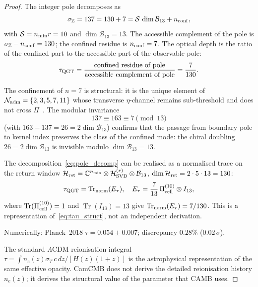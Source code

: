 \documentclass[twocolumn,10pt]{article}
\newcommand{\Nadm}{\mathcal{N}_{\rm adm}}
\newcommand{\Bone}{\mathcal{B}_{13}}
\begin{document}
\begin{proof}
The integer pole decomposes as
\begin{equation}
  \sigma_{\mathbb{Z}} = 137 = 130 + 7
  = \mathcal{S}\,\dim\Bone + n_{\rm conf},
  \label{eq:pole_decomp}
\end{equation}
with $\mathcal{S}=n_{\rm min}r=10$ and $\dim\Bone=13$.
The accessible complement of the pole is $\sigma_{\mathbb{Z}}-n_{\rm conf}=130$;
the confined residue is $n_{\rm conf}=7$.
The optical depth is the ratio of the confined part to the accessible
part of the observable pole:
\begin{equation*}
  \tau_{\rm QGT}
  = \frac{\text{confined residue of pole}}{\text{accessible complement of pole}}
  = \frac{7}{130}.
\end{equation*}

The confinement of $n=7$ is structural: it is the unique element of
$\Nadm=\{2,3,5,7,11\}$ whose transverse $\eta$-channel remains
sub-threshold and does not cross $\Pi$~\cite{CamP11,CamKer163}.
The modular invariance
\begin{equation*}
  137 \equiv 163 \equiv 7 \pmod{13}
\end{equation*}
(with $163-137=26=2\dim\Bone$) confirms that the passage from boundary
pole to kernel index preserves the class of the confined mode:
the chiral doubling $26=2\dim\Bone$ is invisible modulo $\dim\Bone=13$.

The decomposition~\eqref{eq:pole_decomp} can be realised as a
normalised trace on the return window
$\mathcal{H}_{\rm ret}=\mathbb{C}^{n_{\rm min}}\otimes
\mathcal{H}_{\rm SVD}^{(r)}\otimes\Bone$,
$\dim\mathcal{H}_{\rm ret}=2\cdot5\cdot13=130$:
\begin{equation*}
  \tau_{\rm QGT}
  = \operatorname{Tr}_{\rm norm}(E_\tau),
  \quad
  E_\tau = \frac{7}{13}\,\Pi_{\rm cell}^{(10)}\otimes I_{13},
\end{equation*}
where $\operatorname{Tr}(\Pi_{\rm cell}^{(10)})=1$ and
$\operatorname{Tr}(I_{13})=13$ give
$\operatorname{Tr}_{\rm norm}(E_\tau)=7/130$.
This is a representation of~\eqref{eq:tau_struct}, not an independent
derivation.

Numerically: Planck~2018 $\tau=0.054\pm0.007$;
discrepancy $0.28\%$ ($0.02\,\sigma$).

The standard $\Lambda$CDM reionisation integral
$\tau=\int n_e(z)\sigma_T\,c\,dz/[H(z)(1+z)]$ is the astrophysical
representation of the same effective opacity. CamCMB does not derive
the detailed reionisation history $n_e(z)$; it derives the structural
value of the parameter that CAMB uses.
\end{proof}
\end{document}
